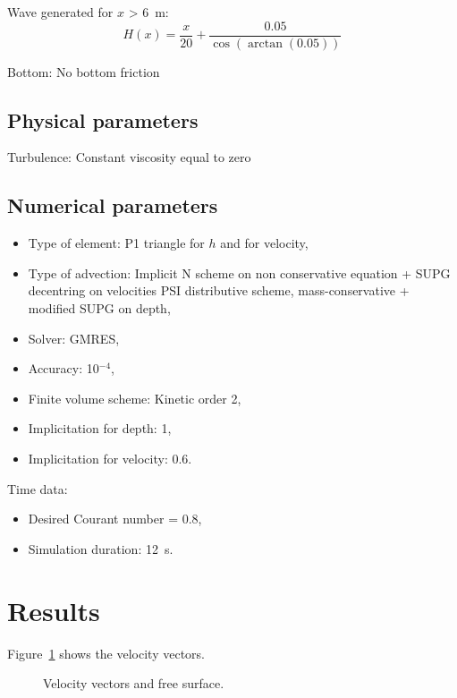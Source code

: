 Wave generated for $x$ > 6~m:
\begin{equation}
H(x) = \frac{x}{20}+\frac{0.05}{\cos(\arctan(0.05))}
\end{equation}

Bottom: No bottom friction

\subsection{Physical parameters}

Turbulence: Constant viscosity equal to zero

\subsection{Numerical parameters}

\begin{itemize}
\item Type of element: P1 triangle for $h$ and for velocity,
\item Type of advection: Implicit N scheme on non conservative equation + SUPG decentring on velocities PSI distributive scheme, mass-conservative + modified SUPG on depth,
\item Solver: GMRES,
\item Accuracy: 10$^{-4}$,
\item Finite volume scheme: Kinetic order 2,
\item Implicitation for depth: 1,
\item Implicitation for velocity: 0.6.
\end{itemize}

Time data:
\begin{itemize}
\item Desired Courant number = 0.8,
\item Simulation duration: 12~s.
\end{itemize}

\section{Results}

Figure~\ref{fig:swash:vel} shows the velocity vectors.

\begin{figure}[H]
\centering
{}
\caption{Velocity vectors and free surface.}
\label{fig:swash:vel}
\end{figure}

